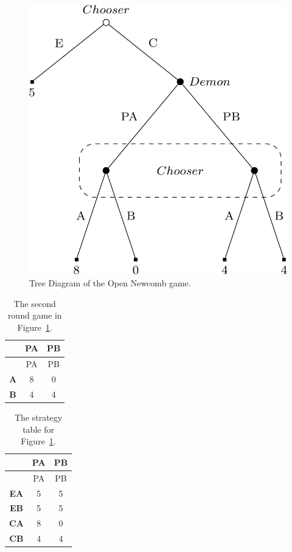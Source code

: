 \documentclass[
  12pt,
  letterpaper,
  DIV=11,
  numbers=noendperiod]{scrreprt}
\begin{document}
\begin{figure}

{\centering \includegraphics{dual_files/figure-pdf/fig-against-consequence-1.png}

}

\caption{\label{fig-against-consequence}Tree Diagram of the Open Newcomb
game.}

\end{figure}

\hypertarget{tbl-against-consequence-short}{}
\begin{longtable}[]{@{}ccc@{}}
\caption{\label{tbl-against-consequence-short}The second round game in
Figure~\ref{fig-against-consequence}.}\tabularnewline
\toprule\noalign{}
& PA & PB \\
\midrule\noalign{}
\endfirsthead
\toprule\noalign{}
& PA & PB \\
\midrule\noalign{}
\endhead
\bottomrule\noalign{}
\endlastfoot
\textbf{A} & 8 & 0 \\
\textbf{B} & 4 & 4 \\
\end{longtable}

\hypertarget{tbl-against-consequence-long}{}
\begin{longtable}[]{@{}ccc@{}}
\caption{\label{tbl-against-consequence-long}The strategy table for
Figure~\ref{fig-against-consequence}.}\tabularnewline
\toprule\noalign{}
& PA & PB \\
\midrule\noalign{}
\endfirsthead
\toprule\noalign{}
& PA & PB \\
\midrule\noalign{}
\endhead
\bottomrule\noalign{}
\endlastfoot
\textbf{EA} & 5 & 5 \\
\textbf{EB} & 5 & 5 \\
\textbf{CA} & 8 & 0 \\
\textbf{CB} & 4 & 4 \\
\end{longtable}
\end{document}
